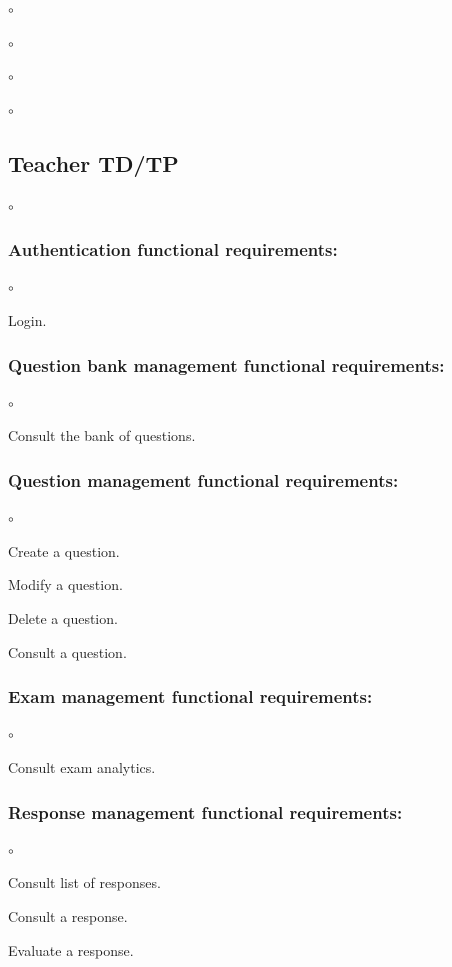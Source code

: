 \documentclass[]{uc2pfecaneva}
\begin{document}
\begin{list}{$\circ$}{}
\begin{list}{$\circ$}{}
\begin{list}{$\circ$}{}
\begin{list}{$\circ$}{}
    \subsection{Teacher TD/TP}
    \begin{list}{$\circ$}{}
        \subsubsection{Authentication functional requirements:}
        \begin{list}{$\circ$}{}
            \item Login.
        \end{list}

        \subsubsection{Question bank management functional requirements:}
        \begin{list}{$\circ$}{}
            \item Consult the bank of questions.
        \end{list}

        \subsubsection{Question management functional requirements:}
        \begin{list}{$\circ$}{}
            \item Create a question.
            \item Modify a question.
            \item Delete a question.
            \item Consult a question.
        \end{list}

        \subsubsection{Exam management functional requirements:}
        \begin{list}{$\circ$}{}
            \item Consult exam analytics.
        \end{list}

        \subsubsection{Response management functional requirements:}
        \begin{list}{$\circ$}{}
            \item Consult list of responses.
            \item Consult a response.
            \item Evaluate a response.
        \end{list}


\end{list}
\end{list}
\end{list}
\end{list}
\end{list}
\end{document}
